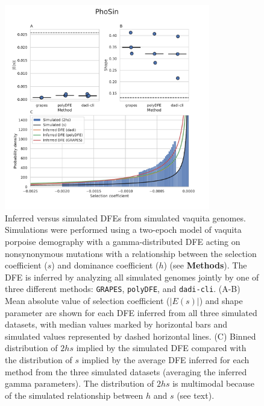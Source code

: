 \documentclass[hidelinks]{article}
\newcommand{\polydfe}{\texttt{polyDFE}\xspace}
\newcommand{\dadicli}{\texttt{dadi-cli}\xspace}
\newcommand{\grapes}{\texttt{GRAPES}\xspace}
\begin{document}
    \begin{figure}[b!]
        \centering
        \includegraphics[width=0.8\textwidth]{figures/PhoSin/Vaquita2Epoch_1R22/PhoSin_Vaquita2Epoch_1R22_Gamma_R22_Phocoena_sinus.mPhoSin1.pri.110_exons_DFE_plot.pdf}
        \caption{
        \label{fig:vaquita-dfe}
        Inferred versus simulated DFEs from simulated vaquita genomes.
        Simulations were performed using a two-epoch model of vaquita porpoise demography with a gamma-distributed DFE
        acting on nonsynonymous mutations with a relationship between the selection coefficient ($s$) and dominance coefficient ($h$) (see \textbf{Methods}).
        The DFE is inferred by analyzing all simulated genomes jointly by one of three different methods:
        \grapes, \polydfe, and \dadicli.
        (A-B) Mean absolute value of selection coefficient ($\lvert E(s) \rvert $) and shape parameter are
        shown for each DFE inferred from all three simulated datasets,
        with median values marked by horizontal bars
        and simulated values represented by dashed horizontal lines. 
        (C) Binned distribution of $2hs$ implied by the simulated DFE compared with
        the distribution of $s$ implied by the average DFE inferred for each method from the three simulated datasets (averaging the inferred gamma parameters).
        The distribution of $2 h s$ is multimodal because of the simulated relationship between $h$ and $s$ (see text).
        }
    \end{figure}
\end{document}

